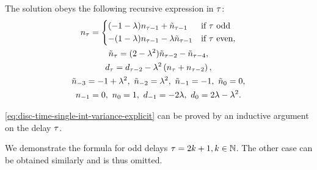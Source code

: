 The solution obeys the following recursive expression in $ \tau $:
\begin{subequations}\label{eq:disc-time-single-int-variance-explicit}
	\begin{gather}
		n_\delayn = \begin{dcases}
			(-1-\gpos)n_{\delayn-1} + \tilde{n}_{\delayn-1} & \mbox{if } \delayn \mbox{ odd}\\
			-(1-\gpos)n_{\delayn-1} - \gpos\tilde{n}_{\delayn-1} & \mbox{if }\delayn \mbox{ even},\\
		\end{dcases} \label{eq:disc-time-single-int-variance-explicit-numerator}\\
		\tilde{n}_{\delayn} = (2-\gpos^2)\tilde{n}_{\delayn-2} - \tilde{n}_{\delayn-4}, \label{eq:disc-time-single-int-variance-explicit-numerator-rem}\\
		d_\delayn = d_{\delayn-2} - \gpos^2\left(n_\delayn+n_{\delayn-2}\right), \label{eq:disc-time-single-int-variance-explicit-denominator}\\
		\tilde{n}_{-3} = -1+\gpos^2, \ \tilde{n}_{-2} = \gpos^2, \ \tilde{n}_{-1} = -1, \ \tilde{n}_0 = 0, \\
		n_{-1} = 0, \ n_0 = 1, \ d_{-1} = -2\gpos, \ d_0 = 2\gpos-\gpos^2.
	\end{gather}
\end{subequations}

\cref{eq:disc-time-single-int-variance-explicit} can be proved by an inductive argument
on the delay $ \tau $.

We demonstrate the formula for odd delays $ \tau = 2k+1, k\in\mathbb{N} $.
The other case can be obtained similarly and is thus omitted. %

